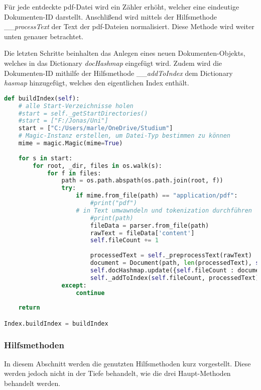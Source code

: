 Für jede entdeckte pdf-Datei wird ein Zähler erhöht, welcher eine
eindeutige Dokumenten-ID darstellt. Anschlißend wird mittels der
Hilfsmethode \_\_\emph{processText} der Text der pdf-Dateien
normalisiert. Diese Methode wird weiter unten genauer betrachtet.

Die letzten Schritte beinhalten das Anlegen eines neuen
Dokumenten-Objekts, welches in das Dictionary \emph{docHashmap}
eingefügt wird. Zudem wird die Dokumenten-ID mithilfe der Hilfsmethode
\_\_\emph{addToIndex} dem Dictionary \emph{hasmap} hinzugefügt, welches
den eigentlichen Index enthält.

\begin{lstlisting}[language=Python]
def buildIndex(self):
    # alle Start-Verzeichnisse holen
    #start = self._getStartDirectories()
    #start = ["F:/Jonas/Uni"]
    start = ["C:/Users/marle/OneDrive/Studium"]
    # Magic-Instanz erstellen, um Datei-Typ bestimmen zu können
    mime = magic.Magic(mime=True)
    
    for s in start:
        for root, _dir, files in os.walk(s):
            for f in files:
                path = os.path.abspath(os.path.join(root, f))
                try:
                    if mime.from_file(path) == "application/pdf":
                        #print("pdf")
                    # in Text umwawndeln und tokenization durchführen
                        #print(path)
                        fileData = parser.from_file(path)
                        rawText = fileData['content']
                        self.fileCount += 1
                    
                        processedText = self._preprocessText(rawText)
                        document = Document(path, len(processedText), self.fileCount)
                        self.docHashmap.update({self.fileCount : document})
                        self._addToIndex(self.fileCount, processedText)
                except:
                    continue
                    
    return

Index.buildIndex = buildIndex
\end{lstlisting}

\subsubsection{Hilfsmethoden}\label{hilfsmethoden}

In diesem Abschnitt werden die genutzten Hilfsmethoden kurz vorgestellt.
Diese werden jedoch nicht in der Tiefe behandelt, wie die drei
Haupt-Methoden behandelt werden.

